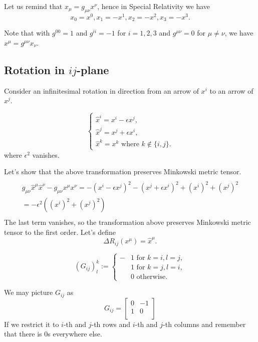 \documentclass[main.tex]{subfiles}
\begin{document}
Let us remind that $x_\mu = g_{\mu\nu}x^\nu$, hence in Special Relativity we have
\begin{equation}
x_0 = x^0, x_1 = -x^1, x_2 = -x^2, x_3 = -x^3. 
\end{equation}

Note that with $g^{00} = 1$ and $g^{ii} = -1$ for $i=1,2,3$ and $g^{\mu\nu} = 0$ for $\mu\not=\nu$, we have $x^\mu = g^{\mu\nu}x_\nu$.



\subsection{Rotation in $ij$-plane}
Consider an infinitesimal rotation in direction from an arrow of $x^i$ to an arrow of $x^j$. 

\begin{equation}
\begin{cases}
\hat{x}^i =  x^i - \epsilon x^j, \\
\hat{x}^j =  x^j + \epsilon x^i, \\
\hat{x}^k = x^k \text{ where } k\not\in\{i, j\}. 
\end{cases}
\end{equation}
where $\epsilon^2$ vanishes.

Let's show that the above transformation preserves Minkowski metric tensor.
\begin{multline*}
\\
g_{\mu\nu} \hat{x}^\mu \hat{x}^\nu - g_{\mu\nu} x^\mu x^\nu = 
 -(x^i - \epsilon x^j)^2 - (x^j + \epsilon x^i)^2 + (x^i)^2 + (x^j)^2 \\
 = -\epsilon^2((x^i)^2 + (x^j)^2)\\
\end{multline*}
The last term vanishes, so the transformation above preserves Minkowski metric tensor to the first order.
Let's define
\begin{equation}
\Delta R_{ij}(x^\mu) = \hat{x}^\mu.
\end{equation}

\begin{equation}
(G_{ij})^k_l :=  
\begin{cases}
-&1 \text{ for } k = i, l = j,\\
&1 \text{ for } k = j, l = i,\\
&0 \text{ otherwise. }
\end{cases}
\end{equation}

We may picture $G_{ij}$ as 
\begin{equation}
G_{ij} = 
\begin{bmatrix}
0 & -1 \\
1 & 0 \\
\end{bmatrix}
\end{equation}
If we restrict it to $i$-th and $j$-th rows and $i$-th and $j$-th columns and remember that there is $0$s everywhere else.
\end{document}
